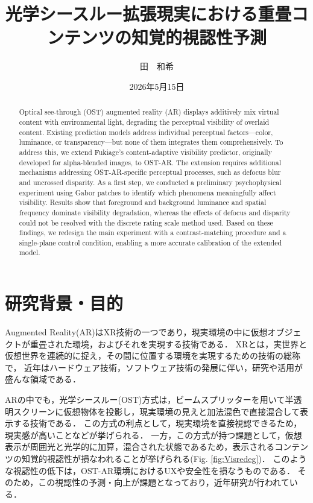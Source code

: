 \documentclass[a4j,10pt,fleqn]{rinkoj}
\begin{document}
	\title{光学シースルー拡張現実における重畳コンテンツの知覚的視認性予測}
	\date{2026年5月15日}
	
	\author{田　和希}
	\maketitle

\begin{abstract}
Optical see-through (OST) augmented reality (AR) displays additively mix virtual content with environmental light, degrading the perceptual visibility of overlaid content.
Existing prediction models address individual perceptual factors—color, luminance, or transparency—but none of them integrates them comprehensively. 
To address this, we extend Fukiage's content-adaptive visibility predictor, originally developed for alpha-blended images, to OST-AR. 
The extension requires additional mechanisms addressing OST-AR-specific perceptual processes, such as defocus blur and uncrossed disparity. 
As a first step, we conducted a preliminary psychophysical experiment using Gabor patches to identify which phenomena meaningfully affect visibility.
Results show that foreground and background luminance and spatial frequency dominate visibility degradation, whereas the effects of defocus and disparity could not be resolved with the discrete rating scale method used. Based on these findings, we redesign the main experiment with a contrast-matching procedure and a single-plane control condition, enabling  a more accurate calibration of the extended model.
\end{abstract}

\section{研究背景・目的}
Augmented Reality(AR)はXR技術の一つであり，現実環境の中に仮想オブジェクトが重畳された環境，およびそれを実現する技術である\cite{Milgram1994TaxonomyMRD}．
XRとは，実世界と仮想世界を連続的に捉え，その間に位置する環境を実現するための技術の総称で，
近年はハードウェア技術，ソフトウェア技術の発展に伴い，研究や活用が盛んな領域である\cite{Rauschnabel2022WhatisXR}．

ARの中でも，光学シースルー(OST)方式は，ビームスプリッターを用いて半透明スクリーンに仮想物体を投影し，現実環境の見えと加法混色で直接混合して表示する技術である\cite{lu2025comparison}．
この方式の利点として，現実環境を直接視認できるため，現実感が高いことなどが挙げられる．
一方，この方式が持つ課題として，仮想表示が周囲光と光学的に加算，混合された状態であるため，表示されるコンテンツの知覚的視認性が損なわれることが挙げられる(Fig. \ref{fig:Visredeg})．
このような視認性の低下は，OST-AR環境におけるUXや安全性を損なうものである\cite{Erickson2021DarkMode,Hussain2023EffectofTrans}．
そのため，この視認性の予測・向上が課題となっており，近年研究が行われている．
\end{document}
